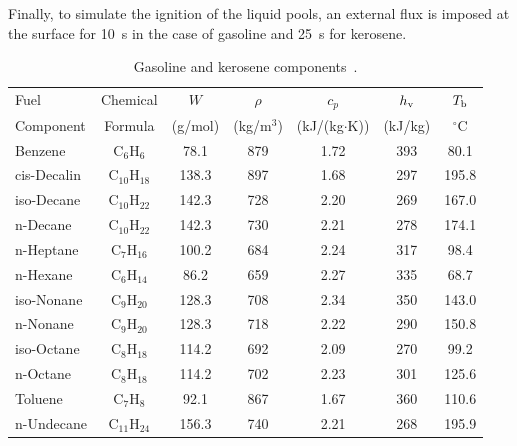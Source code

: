 Finally, to simulate the ignition of the liquid pools, an external flux is imposed at the surface for 10~s in the case of gasoline and 25~s for kerosene.

\begin{table}[h!]
\begin{center}
\caption[Gasoline and kerosene components]{Gasoline and kerosene components~\cite{CRCHandbook:Enthalpy_of_Vaporization}.}
\label{fuelprops2}
\begin{tabular}{|l|c|c|c|c|c|c|} \hline
Fuel        & Chemical          & $W$         & $\rho$      & $c_p$              & $h_{\rm v}$        & $T_{\rm b}$     \\
Component   & Formula           & (g/mol)     & (kg/m$^3$)  & (kJ/(kg$\cdot$K))  & (kJ/kg)            & $^\circ$C       \\
\hline \hline
Benzene     & C$_6$H$_{6}$      & 78.1        & 879         & 1.72              & 393                 & 80.1   \\ \hline
cis-Decalin & C$_{10}$H$_{18}$  & 138.3       & 897         & 1.68              & 297                 & 195.8  \\ \hline
iso-Decane  & C$_{10}$H$_{22}$  & 142.3       & 728         & 2.20              & 269                 & 167.0  \\ \hline
n-Decane    & C$_{10}$H$_{22}$  & 142.3       & 730         & 2.21              & 278                 & 174.1  \\ \hline
n-Heptane   & C$_7$H$_{16}$     & 100.2       & 684         & 2.24              & 317                 & 98.4   \\ \hline
n-Hexane    & C$_6$H$_{14}$     & 86.2        & 659         & 2.27              & 335                 & 68.7   \\ \hline
iso-Nonane  & C$_9$H$_{20}$     & 128.3       & 708         & 2.34              & 350                 & 143.0  \\ \hline
n-Nonane    & C$_9$H$_{20}$     & 128.3       & 718         & 2.22              & 290                 & 150.8  \\ \hline
iso-Octane  & C$_8$H$_{18}$     & 114.2       & 692         & 2.09              & 270                 & 99.2   \\ \hline
n-Octane    & C$_8$H$_{18}$     & 114.2       & 702         & 2.23              & 301                 & 125.6  \\ \hline
Toluene     & C$_7$H$_{8}$      & 92.1        & 867         & 1.67              & 360                 & 110.6  \\ \hline
n-Undecane  & C$_{11}$H$_{24}$  & 156.3       & 740         & 2.21              & 268                 & 195.9  \\ \hline
\end{tabular}
\end{center}
\end{table}


